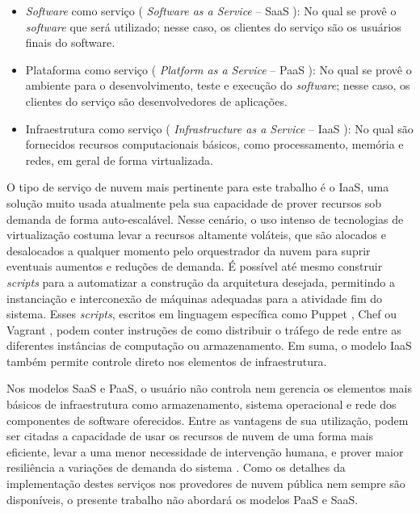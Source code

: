 \begin{itemize}
	\item \textit{Software} como serviço ( \textit{Software as a Service} -- SaaS ): No qual se provê o \textit{software} que será utilizado; nesse caso, os clientes do serviço são os usuários finais do software.
	
	\item Plataforma como serviço ( \textit{Platform as a Service} -- PaaS ): No qual se provê o ambiente para o desenvolvimento, teste e execução do \textit{software}; nesse caso, os clientes do serviço são desenvolvedores de aplicações.
	
	\item Infraestrutura como serviço ( \textit{Infrastructure as a Service} -- IaaS ): No qual são fornecidos recursos computacionais básicos, como processamento, memória e redes, em geral de forma virtualizada.
\end{itemize}

O tipo de serviço de nuvem mais pertinente para este trabalho é o IaaS, uma solução muito usada atualmente pela sua capacidade de prover recursos sob demanda de forma auto-escalável.
%
Nesse cenário, o uso intenso de tecnologias de virtualização costuma levar a recursos altamente voláteis, que são alocados e desalocados a qualquer momento pelo orquestrador da nuvem para suprir eventuais aumentos e reduções de demanda.
%
É possível até mesmo construir \textit{scripts} para a automatizar a construção da arquitetura desejada, permitindo a instanciação e interconexão de máquinas adequadas para a atividade fim do sistema.
%
Esses \textit{scripts}, escritos em linguagem específica como Puppet \cite{Puppet2018}, Chef \cite{Chef2018} ou Vagrant \cite{Vagrant2018}, podem conter instruções de como distribuir o tráfego de rede entre as diferentes instâncias de computação ou armazenamento.
%
Em suma, o modelo IaaS também permite controle direto nos elementos de infraestrutura. %
%

Nos modelos SaaS e PaaS, o usuário não controla nem gerencia os elementos mais básicos de infraestrutura como armazenamento, sistema operacional e rede dos componentes de software oferecidos. 
%
Entre as vantagens de sua utilização, podem ser citadas a capacidade de usar os recursos de nuvem de uma forma mais eficiente, levar a uma menor necessidade de intervenção humana, e prover maior resiliência a variações de demanda do sistema  \cite{NIST2011}.
%
Como os detalhes da implementação destes serviços nos provedores de nuvem pública nem sempre são disponíveis, o presente trabalho não abordará os modelos PaaS e SaaS.
%



